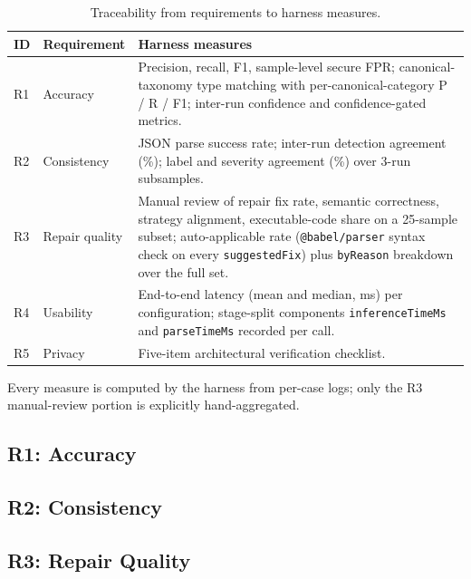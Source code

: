 \begin{table}[H]
  \centering
  \caption{Traceability from requirements to harness measures.}
  \label{tab:requirements-measures-trace}
  \footnotesize
  \renewcommand{\arraystretch}{1.2}
  \begin{tabularx}{\textwidth}{p{}p{}X}
    \toprule
    ID & Requirement & Harness measures \\
    \midrule
    R1 & Accuracy & Precision, recall, F1, sample-level secure FPR; canonical-taxonomy type matching with per-canonical-category P / R / F1; inter-run confidence and confidence-gated metrics. \\
    \midrule
    R2 & Consistency & JSON parse success rate; inter-run detection agreement (\%); label and severity agreement (\%) over 3-run subsamples. \\
    \midrule
    R3 & Repair quality & Manual review of repair fix rate, semantic correctness, strategy alignment, executable-code share on a 25-sample subset; auto-applicable rate (\texttt{@babel/parser} syntax check on every \texttt{suggestedFix}) plus \texttt{byReason} breakdown over the full set. \\
    \midrule
    R4 & Usability & End-to-end latency (mean and median, ms) per configuration; stage-split components \texttt{inferenceTimeMs} and \texttt{parseTimeMs} recorded per call. \\
    \midrule
    R5 & Privacy & Five-item architectural verification checklist. \\
    \bottomrule
  \end{tabularx}
\end{table}

Every measure is computed by the harness from per-case logs; only the R3 manual-review portion is explicitly hand-aggregated.

\subsection{R1: Accuracy}\vspace{-2mm}


\subsection{R2: Consistency}\vspace{-2mm}


\subsection{R3: Repair Quality}\vspace{-2mm}


